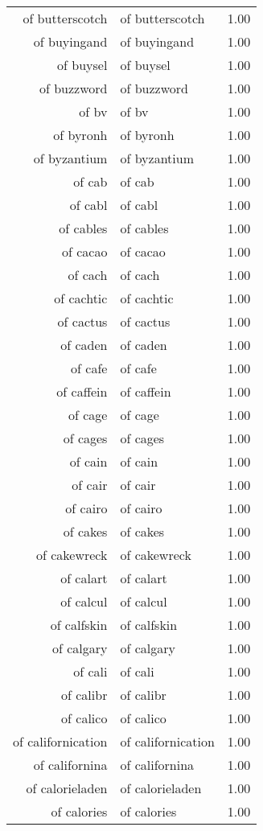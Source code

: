 \begin{table}[ht]
\begin{tabular}{rlr}
  of butterscotch & of butterscotch & 1.00 \\ 
  of buyingand & of buyingand & 1.00 \\ 
  of buysel & of buysel & 1.00 \\ 
  of buzzword & of buzzword & 1.00 \\ 
  of bv & of bv & 1.00 \\ 
  of byronh & of byronh & 1.00 \\ 
  of byzantium & of byzantium & 1.00 \\ 
  of cab & of cab & 1.00 \\ 
  of cabl & of cabl & 1.00 \\ 
  of cables & of cables & 1.00 \\ 
  of cacao & of cacao & 1.00 \\ 
  of cach & of cach & 1.00 \\ 
  of cachtic & of cachtic & 1.00 \\ 
  of cactus & of cactus & 1.00 \\ 
  of caden & of caden & 1.00 \\ 
  of cafe & of cafe & 1.00 \\ 
  of caffein & of caffein & 1.00 \\ 
  of cage & of cage & 1.00 \\ 
  of cages & of cages & 1.00 \\ 
  of cain & of cain & 1.00 \\ 
  of cair & of cair & 1.00 \\ 
  of cairo & of cairo & 1.00 \\ 
  of cakes & of cakes & 1.00 \\ 
  of cakewreck & of cakewreck & 1.00 \\ 
  of calart & of calart & 1.00 \\ 
  of calcul & of calcul & 1.00 \\ 
  of calfskin & of calfskin & 1.00 \\ 
  of calgary & of calgary & 1.00 \\ 
  of cali & of cali & 1.00 \\ 
  of calibr & of calibr & 1.00 \\ 
  of calico & of calico & 1.00 \\ 
  of californication & of californication & 1.00 \\ 
  of californina & of californina & 1.00 \\ 
  of calorieladen & of calorieladen & 1.00 \\ 
  of calories & of calories & 1.00 \\ 

\end{tabular}
\end{table}
